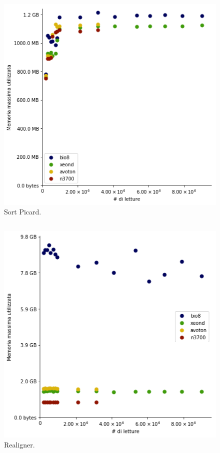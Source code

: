 \documentclass{beamer}
\begin{document}
\begin{frame}
\begin{columns}
\begin{column}{0.8\linewidth}	
\begin{figure}[H]
\centering
\includegraphics[scale=0.46]{Max_rss_sort_picard.png}
\caption{Sort Picard.}
\label{fig:RSSind}
\end{figure}
\end{column}
\end{columns}
\end{frame}

\begin{frame}
\begin{columns}
\begin{column}{0.8\linewidth}	
\begin{figure}[H]
\centering
\includegraphics[scale=0.46]{Max_rss_realigner.png}
\caption{Realigner.}
\label{fig:RSSind}
\end{figure}
\end{column}
\end{columns}
\end{frame}
\end{document}
